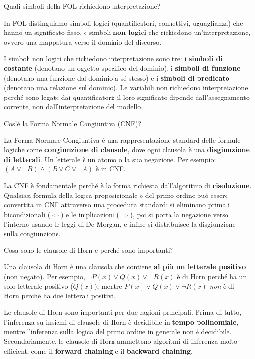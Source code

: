 \documentclass[12pt,a4paper]{article}
\begin{document}
\begin{domandabox}{Quali simboli della FOL richiedono interpretazione?}
\end{domandabox}

In FOL distinguiamo simboli logici (quantificatori, connettivi, uguaglianza) che hanno un significato fisso, e simboli \textbf{non logici} che richiedono un'interpretazione, ovvero una mappatura verso il dominio del discorso.

I simboli non logici che richiedono interpretazione sono tre: i \textbf{simboli di costante} (denotano un oggetto specifico del dominio), i \textbf{simboli di funzione} (denotano una funzione dal dominio a sé stesso) e i \textbf{simboli di predicato} (denotano una relazione sul dominio). Le variabili non richiedono interpretazione perché sono legate dai quantificatori: il loro significato dipende dall'assegnamento corrente, non dall'interpretazione del modello.

\begin{domandabox}{Cos'è la Forma Normale Congiuntiva (CNF)?}
\end{domandabox}

La Forma Normale Congiuntiva è una rappresentazione standard delle formule logiche come \textbf{congiunzione di clausole}, dove ogni clausola è una \textbf{disgiunzione di letterali}. Un letterale è un atomo o la sua negazione. Per esempio: $(A \lor \neg B) \land (B \lor C \lor \neg A)$ è in CNF.

La CNF è fondamentale perché è la forma richiesta dall'algoritmo di \textbf{risoluzione}. Qualsiasi formula della logica proposizionale o del primo ordine può essere convertita in CNF attraverso una procedura standard: si eliminano prima i bicondizionali ($\Leftrightarrow$) e le implicazioni ($\Rightarrow$), poi si porta la negazione verso l'interno usando le leggi di De Morgan, e infine si distribuisce la disgiunzione sulla congiunzione.

\begin{domandabox}{Cosa sono le clausole di Horn e perché sono importanti?}
\end{domandabox}

Una clausola di Horn è una clausola che contiene \textbf{al più un letterale positivo} (non negato). Per esempio, $\neg P(x) \lor Q(x) \lor \neg R(x)$ è di Horn perché ha un solo letterale positivo ($Q(x)$), mentre $P(x) \lor Q(x) \lor \neg R(x)$ \emph{non} è di Horn perché ha due letterali positivi.

Le clausole di Horn sono importanti per due ragioni principali. Prima di tutto, l'inferenza su insiemi di clausole di Horn è decidibile in \textbf{tempo polinomiale}, mentre l'inferenza sulla logica del primo ordine in generale non è decidibile. Secondariamente, le clausole di Horn ammettono algoritmi di inferenza molto efficienti come il \textbf{forward chaining} e il \textbf{backward chaining}.
\end{document}
